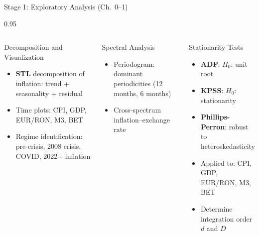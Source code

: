 \documentclass[9pt, aspectratio=169, t]{beamer}
\begin{document}
\begin{frame}{Stage 1: Exploratory Analysis (Ch.\ 0--1)}
    \begin{cminipage}{0.95\textwidth}
        {\footnotesize
        \begin{columns}[T]
            \begin{block}{Decomposition and Visualization}
                \begin{itemize}\setlength{\itemsep}{0pt}
                    \item \textbf{STL} decomposition of inflation: trend + seasonality + residual
                    \item Time plots: CPI, GDP, EUR/RON, M3, BET
                    \item Regime identification: pre-crisis, 2008 crisis, COVID, 2022+ inflation
                \end{itemize}
            \end{block}

            \vspace{0.15cm}

            \begin{exampleblock}{Spectral Analysis}
                \begin{itemize}\setlength{\itemsep}{0pt}
                    \item Periodogram: dominant periodicities (12 months, 6 months)
                    \item Cross-spectrum inflation--exchange rate
                \end{itemize}
            \end{exampleblock}

            \begin{alertblock}{Stationarity Tests}
                \begin{itemize}\setlength{\itemsep}{0pt}
                    \item \textbf{ADF}: $H_0$: unit root
                    \item \textbf{KPSS}: $H_0$: stationarity
                    \item \textbf{Phillips-Perron}: robust to heteroskedasticity
                    \item Applied to: CPI, GDP, EUR/RON, M3, BET
                    \item Determine integration order $d$ and $D$
                \end{itemize}
            \end{alertblock}


\end{columns}}
\end{cminipage}
\end{frame}
\end{document}
